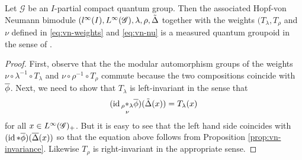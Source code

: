 \begin{Theorem}
Let $\mathscr{G}$ be an $I$-partial compact quantum group. Then the
associated Hopf-von Neumann bimodule
$(l^{\infty}(I),L^{\infty}(\mathscr{G}),\lambda,\rho,\tilde\Delta$ together with the weights
    $(T_{\lambda},T_{\rho}$ and $\nu$ defined in
    \eqref{eq:vn-weights} and \eqref{eq:vn-nu}
  is a measured quantum groupoid in the sense of \cite{enock:action}.
\end{Theorem}
\begin{proof}
  First, observe that the  the modular
  automorphism groups of the weights $\nu \circ \lambda^{-1} \circ
  T_{\lambda}$ and $\nu \circ \rho^{-1} \circ T_{\rho}$ commute  because the two
  compositions coincide with $\overline{\phi}$. Next, we need  to show that
  $T_{\lambda}$ is left-invariant in the sense that
  \begin{align*}
   (\operatorname{id} \underset{\nu}{_{\rho}\ast_{\lambda}} \overline{\phi})(\tilde\Delta(x)) = T_{\lambda}(x) 
  \end{align*}
for all $x\in L^{\infty}(\mathscr{G})_{+}$. But it is easy to see that the left hand
side coincides with   $(\operatorname{id} \ast \overline{\phi})(\overline{\Delta}(x))$ so that the
equation above follows from Proposition
\ref{prop:vn-invariance}. Likewise $T_{\rho}$ is right-invariant in
the appropriate sense.
\end{proof}



